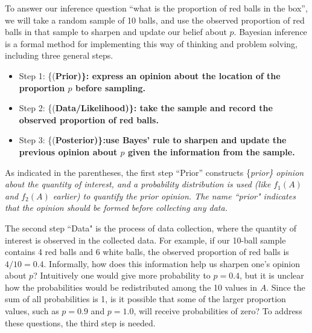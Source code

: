 \documentclass[]{book}
\begin{document}
To answer our inference question ``what is the proportion of red balls in the box'', we will take a random sample of 10 balls, and use the observed proportion of red balls in that sample to sharpen and update our belief about \(p\). Bayesian inference is a formal method for implementing this way of thinking and problem solving, including three general steps.

\begin{itemize}
\item
  Step 1: \{(\bf Prior)\}: express an opinion about the location of the proportion \(p\) before sampling.
\item
  Step 2: \{(\bf Data/Likelihood)\}: take the sample and record the observed proportion of red balls.
\item
  Step 3: \{(\bf Posterior)\}:use Bayes' rule to sharpen and update the previous opinion about \(p\) given the information from the sample.
\end{itemize}

As indicated in the parentheses, the first step ``Prior'' constructs \{\it prior\} opinion about the quantity of interest, and a probability distribution is used (like \(f_1(A)\) and \(f_2(A)\) earlier) to quantify the prior opinion. The name ``prior" indicates that the opinion should be formed before collecting any data.

The second step ``Data" is the process of data collection, where the quantity of interest is observed in the collected data. For example, if our 10-ball sample contains 4 red balls and 6 white balls, the observed proportion of red balls is \(4/10 = 0.4\). Informally, how does this information help us sharpen one's opinion about \(p\)? Intuitively one would give more probability to \(p = 0.4\), but it is unclear how the probabilities would be redistributed among the 10 values in \(A\). Since the sum of all probabilities is 1, is it possible that some of the larger proportion values, such as \(p = 0.9\) and \(p = 1.0\), will receive probabilities of zero? To address these questions, the third step is needed.
\end{document}
